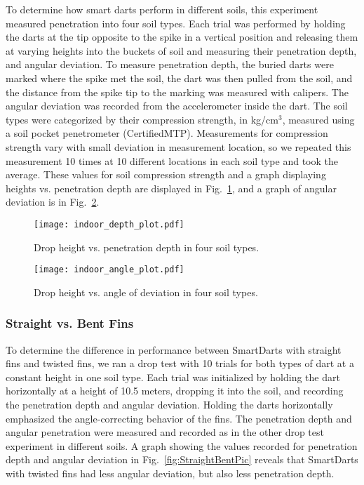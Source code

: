 To determine how smart darts perform in different soils, this experiment measured penetration into four soil types. Each trial was performed by holding the darts at the tip opposite to the spike in a vertical position and releasing them at varying heights into the buckets of soil and measuring their penetration depth, and angular deviation. To measure penetration depth, the buried darts were marked where the spike met the soil, the dart was then pulled from the soil, and the distance from the spike tip to the marking was measured with calipers. The angular deviation was recorded from the accelerometer inside the dart. The soil types were categorized by their compression strength, in kg/cm$^3$, measured using a soil pocket penetrometer (CertifiedMTP). Measurements for compression strength vary with small deviation in measurement location, so we repeated this measurement 10 times at 10 different locations in each soil type and took the average. These values for soil compression strength and a graph displaying heights vs. penetration depth are displayed in Fig.~\ref{fig:DepthPlotIndoors}, and a graph of angular deviation is in Fig.~\ref{fig:AnglePlotIndoors}. 


\begin{figure} \centering
{\texttt{[image: indoor\_depth\_plot.pdf]}}
\caption{Drop height vs. penetration depth in four soil types.} 
\label{fig:DepthPlotIndoors}
\end{figure}

\begin{figure} \centering
{\texttt{[image: indoor\_angle\_plot.pdf]}}
\caption{Drop height vs. angle of deviation in four soil types.} 
\label{fig:AnglePlotIndoors}
\vspace{-1em}
\end{figure}

\subsubsection{Straight vs. Bent Fins}

To determine the difference in performance between SmartDarts with straight fins and twisted fins, we ran a drop test with 10 trials for both types of dart at a constant height in one soil type. Each trial was initialized by holding the dart horizontally at a height of 10.5 meters, dropping it into the soil, and recording the penetration depth and angular deviation. Holding the darts horizontally emphasized the angle-correcting behavior of the fins. The penetration depth and angular penetration were measured and recorded as in the other drop test experiment in different soils. A graph showing the values recorded for penetration depth and angular deviation in Fig.~\ref{fig:StraightBentPic}  reveals that SmartDarts with twisted fins had less angular deviation, but also less penetration depth. 

